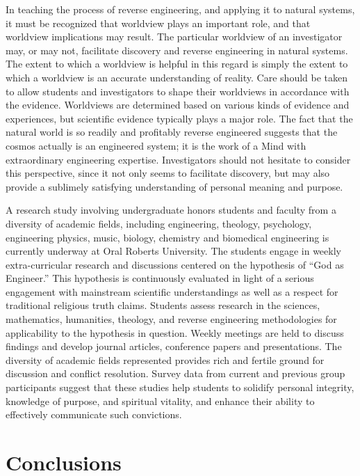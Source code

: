 In teaching the process of reverse engineering, and applying it to
natural systems, it must be recognized that worldview plays an
important role, and that worldview implications may result. The
particular worldview of an investigator may, or may not, facilitate
discovery and reverse engineering in natural systems. The extent to
which a worldview is helpful in this regard is simply the extent to
which a worldview is an accurate understanding of reality. Care should
be taken to allow students and investigators to shape their worldviews
in accordance with the evidence. Worldviews are determined based on
various kinds of evidence and experiences, but scientific evidence
typically plays a major role. The fact that the natural world is so
readily and profitably reverse engineered suggests that the cosmos
actually is an engineered system; it is the work of a Mind with
extraordinary engineering expertise. Investigators should not hesitate
to consider this perspective, since it not only seems to facilitate
discovery, but may also provide a sublimely satisfying understanding of
personal meaning and purpose.

A research study involving undergraduate honors students and faculty
from a diversity of academic fields, including engineering, theology,
psychology, engineering physics, music, biology, chemistry and
biomedical engineering is currently underway at Oral Roberts
University.\citep{halsmerbeck2012} The students engage in weekly
extra-curricular research and discussions centered on the hypothesis of
“God as Engineer.” This hypothesis is continuously evaluated in light
of a serious engagement with mainstream scientific understandings as
well as a respect for traditional religious truth claims. Students
assess research in the sciences, mathematics, humanities, theology, and
reverse engineering methodologies for applicability to the hypothesis
in question. Weekly meetings are held to discuss findings and develop
journal articles, conference papers and presentations. The diversity of
academic fields represented provides rich and fertile ground for
discussion and conflict resolution. Survey data from current and
previous group participants suggest that these studies help students to
solidify personal integrity, knowledge of purpose, and spiritual
vitality, and enhance their ability to effectively communicate such
convictions.

\section{Conclusions}


